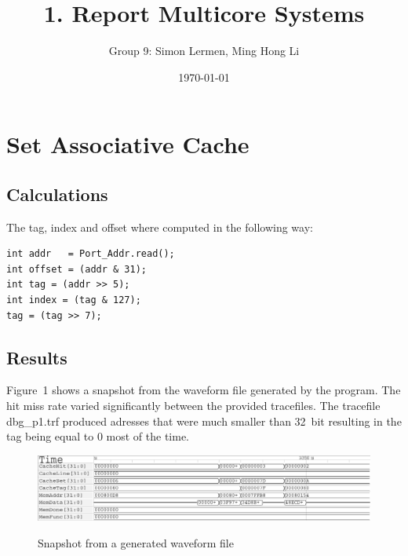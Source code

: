 \documentclass[11pt]{scrartcl}
\title{1. Report Multicore Systems}
\author{Group 9: Simon Lermen, Ming Hong Li}
\date{\today}
\begin{document}
\maketitle
\section{Set Associative Cache}

\subsection{Calculations}

The tag, index and offset where computed in the following way:
\begin{lstlisting}
int addr   = Port_Addr.read();
int offset = (addr & 31);
int tag = (addr >> 5);
int index = (tag & 127);     
tag = (tag >> 7); 
\end{lstlisting}

\subsection{Results}

Figure~1 shows a snapshot from the waveform file generated by the program.
The hit miss rate varied significantly between the provided tracefiles. The tracefile dbg\_p1.trf produced adresses that were much smaller than 32~bit resulting in the tag being equal to 0 most of the time.

\begin{figure}
\centering
\includegraphics[scale=0.7]{./graphics/wavefilecut.pdf}
\label{fig:waveform}
\caption{Snapshot from a generated waveform file}
\end{figure}
\end{document}
